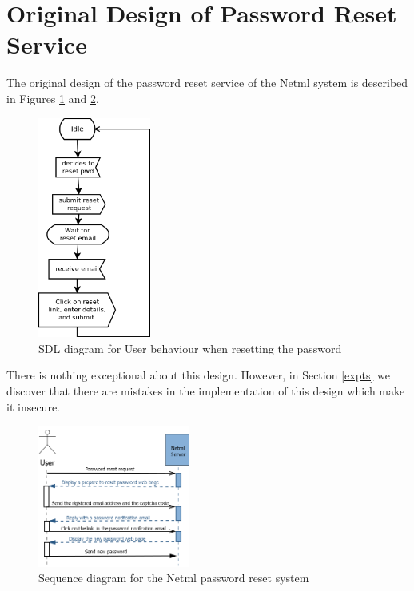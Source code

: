 \section{Original Design of Password Reset Service}\label{initial}

The original design of the password reset
service of the Netml system is described in Figures \ref{usersdl} and
\ref{seqdgnetmlorg}.
\begin{figure}
\begin{center}
\vspace{5mm}
\includegraphics[width=37mm]{figures/resetpwd.png}
\caption{SDL diagram for User behaviour when resetting the password}
\label{usersdl}
\end{center}
\end{figure}

There is nothing exceptional about this design. However, in Section \ref{expts}
we discover that there are mistakes in the implementation of this design which
make it insecure.

\begin{figure}
	\centering
		\includegraphics[width=5cm]{figures/User.png}
\caption{Sequence diagram for the Netml password reset  system }
\label{seqdgnetmlorg}
\end{figure}
	

